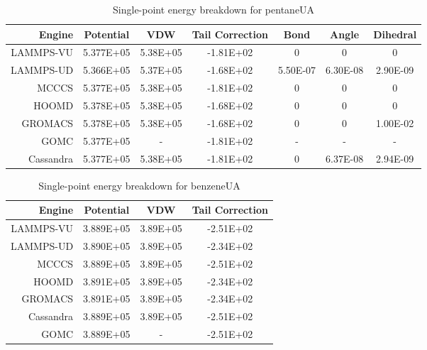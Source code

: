 \begin{table}
\caption{Single-point energy breakdown for pentaneUA}\label{tab:sp_pentane}
\centering
\begin{tabular}{rcccccc}
\hline
Engine & Potential & VDW & Tail Correction & Bond & Angle & Dihedral \\ \hline
LAMMPS-VU & 5.377E+05 & 5.38E+05 & -1.81E+02 & 0 & 0 & 0 \\
LAMMPS-UD & 5.366E+05 & 5.37E+05 & -1.68E+02 & 5.50E-07 & 6.30E-08 & 2.90E-09 \\
MCCCS & 5.377E+05 & 5.38E+05 & -1.81E+02 & 0 & 0 & 0 \\
HOOMD & 5.378E+05 & 5.38E+05 & -1.68E+02 & 0 & 0 & 0 \\
GROMACS & 5.378E+05 & 5.38E+05 & -1.68E+02 & 0 & 0 & 1.00E-02 \\
GOMC & 5.377E+05 & - & -1.81E+02 & - & - & - \\
Cassandra & 5.377E+05 & 5.38E+05 & -1.81E+02 & 0 & 6.37E-08 & 2.94E-09 \\ \hline
\end{tabular}
\end{table}

\begin{table}
\caption{Single-point energy breakdown for benzeneUA}\label{tab:sp_benzene}
\centering
\begin{tabular}{rccc}
\hline
Engine & Potential & VDW & Tail Correction \\ \hline
LAMMPS-VU & 3.889E+05 & 3.89E+05 & -2.51E+02 \\
LAMMPS-UD & 3.890E+05 & 3.89E+05 & -2.34E+02 \\
MCCCS & 3.889E+05 & 3.89E+05 & -2.51E+02 \\
HOOMD & 3.891E+05 & 3.89E+05 & -2.34E+02 \\
GROMACS & 3.891E+05 & 3.89E+05 & -2.34E+02 \\
Cassandra & 3.889E+05 & 3.89E+05 & -2.51E+02 \\
GOMC & 3.889E+05 & - & -2.51E+02 \\ \hline
\end{tabular}
\end{table}


